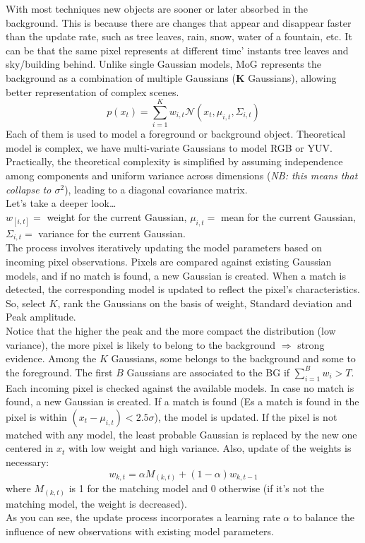 With most techniques new objects are sooner or later absorbed in the background. This is because there are changes that appear and disappear faster than the update rate, such as tree leaves, rain, snow, water of a fountain, etc.
It can be that the same pixel represents at different time' instants tree leaves and sky/building behind.
Unlike single Gaussian models, MoG represents the background as a combination of multiple Gaussians (\textbf{K} Gaussians), allowing better representation of complex scenes. 
\[
    p(x_t) = \sum_{i=1}^{K} w_{i,t} \mathcal{N}(x_t, \mu_{i,t}, \Sigma_{i,t})
\]
Each of them is used to model a foreground or background object. Theoretical model is complex, we have multi-variate Gaussians to model RGB or YUV. 
\\
Practically, the theoretical complexity is simplified by assuming independence among components and uniform variance across dimensions (\textit{NB: this means that collapse to $\sigma^2$}), leading to a diagonal covariance matrix. 
\\Let's take a deeper look\dots\\
$w_[i,t] = $ weight for the current Gaussian, $\mu_{i,t} = $ mean for the current Gaussian, $\Sigma_{i,t} = $ variance for the current Gaussian.
\\
The process involves iteratively updating the model parameters based on incoming pixel observations. 
Pixels are compared against existing Gaussian models, and if no match is found, a new Gaussian is created. 
When a match is detected, the corresponding model is updated to reflect the pixel's characteristics.
\\
So, select $K$, rank the Gaussians on the basis of weight, Standard deviation and Peak amplitude.
\\
Notice that the higher the peak and the more compact the distribution (low variance), the more pixel is likely to belong to the background $\Rightarrow$ strong evidence.
Among the $K$ Gaussians, some belongs to the background and some to the foreground. The first $B$ Gaussians are associated to the BG if $\sum_{i=1}^B w_i > T$.
Each incoming pixel is checked against the available models. In case no match is found, a new Gaussian is created. 
If a match is found (Es a match is found in the pixel is within $(x_t - \mu_{i, t})<2.5\sigma$), the model is updated. 
If the pixel is not matched with any model, the least probable Gaussian is replaced by the new one centered in $x_t$ with low weight and high variance.  
Also, update of the weights is necessary: 
\[
    w_{k,t} = \alpha M_(k,t) + (1-\alpha)w_{k,t-1}
\] 
where $M_(k,t)$ is 1 for the matching model and 0 otherwise (if it's not the matching model, the weight is decreased). 
\\
As you can see, the update process incorporates a learning rate $\alpha$ to balance the influence of new observations with existing model parameters.
